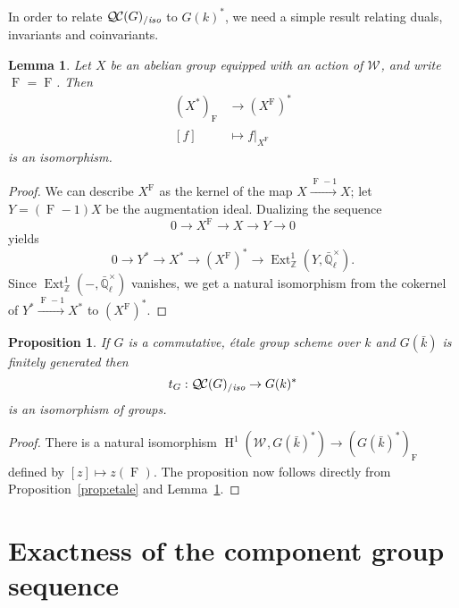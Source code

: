 \documentclass[11pt]{amsart}
\theoremstyle{plain}
\newtheorem{proposition}[theorem]{Proposition}
\newtheorem{lemma}[theorem]{Lemma}
\theoremstyle{definition}
\theoremstyle{remark}
\newcommand{\ZZ}{{\mathbb{Z}}}
\newcommand{\EE}{\mathbb{\bar Q}_\ell}
\newcommand{\bFq}{\bar{k}}
\newcommand{\Fq}{k}
\newcommand{\EEx}{\EE^\times}
\newcommand{\Frob}[1]{\operatorname{F}_{#1}}
\DeclareMathOperator{\Ext}{Ext}
\DeclareMathOperator{\Hh}{H}
\newcommand{\QC}{{\mathcal{Q\hskip-0.8pt C}}}
\newcommand{\QCiso}[1]{\QC(#1)_{/\textit{iso}}}
\newcommand{\Weil}[1]{\mathcal{W}_{#1}}
\newcommand{\trFrob}[1]{t_{#1}}
\begin{document}
In order to relate $\QCiso{G}$ to $G(k)^*$, we need a simple result relating duals, invariants and coinvariants.

\begin{lemma} \label{lem:dual-inv}
Let $X$ be an abelian group equipped with an action of $\Weil{}$, and write $\Frob{} = \Frob{}$.  Then
\begin{align*}
 (X^*)_{\Frob{}} &\to (X^{\Frob{}})^* \\
 [f] &\mapsto f|_{X^{\Frob{}}}
\end{align*}
is an isomorphism.
\end{lemma}
\begin{proof}
We can describe $X^{\Frob{}}$ as the kernel of the map $X \xrightarrow{\Frob{}-1} X$;
let $Y = (\Frob{}-1)X$ be the augmentation ideal.  Dualizing the sequence
\[
 0 \to X^{\Frob{}} \to X \to Y \to 0
\]
yields
\[
 0 \to Y^* \to X^* \to (X^{\Frob{}})^* \to \Ext^1_\ZZ(Y, \EEx).
\]
Since $\Ext^1_\ZZ(-,\EEx)$ vanishes, we get a natural isomorphism from the cokernel of $Y^* \xrightarrow{\Frob{}-1} X^*$ to $(X^{\Frob{}})^*$.
\end{proof}

\begin{proposition} \label{prop:etale-iso}
 If $G$ is a commutative, \'etale group scheme over $\Fq$ and $G(\bFq)$ is finitely
 generated then
 \[
  \trFrob{G} : \QCiso{G} \to G(\Fq)^*
 \]
 is an isomorphism of groups.
\end{proposition}
\begin{proof}
There is a natural isomorphism $\Hh^1(\Weil{}, G(\bFq)^*) \to (G(\bFq)^*)_{\Frob{}}$ defined by $[z] \mapsto z(\Frob{})$.  The proposition now follows directly from Proposition~\ref{prop:etale} and Lemma~\ref{lem:dual-inv}.
\end{proof}

\section{Exactness of the component group sequence} \label{sec:restriction}
\end{document}
